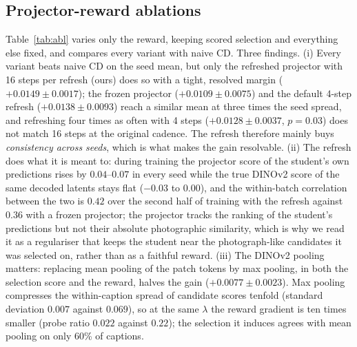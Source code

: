 \documentclass{article} %
\newcommand{\fitbox}[1]{\resizebox{\ifdim\width>\linewidth\linewidth\else\width\fi}{!}{#1}}
\newcommand{\naive}{naive CD}
\begin{document}
\subsection{Projector-reward ablations}
\label{sec:results-abl}
Table~\ref{tab:abl} varies only the reward, keeping scored selection and everything else fixed, and
compares every variant with \naive{}. Three findings. (i) Every variant beats \naive{} on the seed mean, but
only the refreshed projector with 16 steps per refresh (ours) does so with a tight, resolved margin
($+0.0149\pm0.0017$); the frozen projector ($+0.0109\pm0.0075$) and the default 4-step refresh
($+0.0138\pm0.0093$) reach a similar mean at three times the seed spread, and refreshing four times as
often with 4 steps ($+0.0128\pm0.0037$, $p{=}0.03$) does not match 16 steps at the original cadence. The
refresh therefore mainly buys \emph{consistency across seeds}, which is what makes the gain resolvable.
(ii) The refresh does what it is meant to: during training the projector score of the student's own
predictions rises by $0.04$--$0.07$ in every seed while the true DINOv2 score of the same decoded latents
stays flat ($-0.03$ to $0.00$), and the within-batch correlation between the two is $0.42$ over the
second half of training with the refresh against $0.36$ with a frozen projector; the projector tracks the
ranking of the student's predictions but not their absolute photographic similarity, which is why we
read it as a regulariser that keeps the student near the photograph-like candidates it was selected on,
rather than as a faithful reward. (iii) The DINOv2 pooling matters: replacing
mean pooling of the patch tokens by max pooling, in both the selection score and the reward, halves the
gain ($+0.0077\pm0.0023$). Max pooling compresses the within-caption spread of candidate scores tenfold
(standard deviation $0.007$ against $0.069$), so at the same $\lambda$ the reward gradient is ten times
smaller (probe ratio $0.022$ against $0.22$); the selection it induces agrees with mean pooling on only
60\% of captions.

\begin{table}[t]
\centering
\caption{Reward ablations, 3k pool, seeds 0--2, averaged checkpoints. Every row except the first uses
scored trajectory selection with the projector reward ($\lambda{=}80$) and differs only in how the
projector is refreshed (or, in the last row, in the DINOv2 pooling used for both selection and reward).
$\Delta$ is seed-paired against \naive{}. CMMD (lower is better) is the seed mean on 5,000 COCO val2017 captions.}
\label{tab:abl}
\fitbox{}
\end{table}
\end{document}
